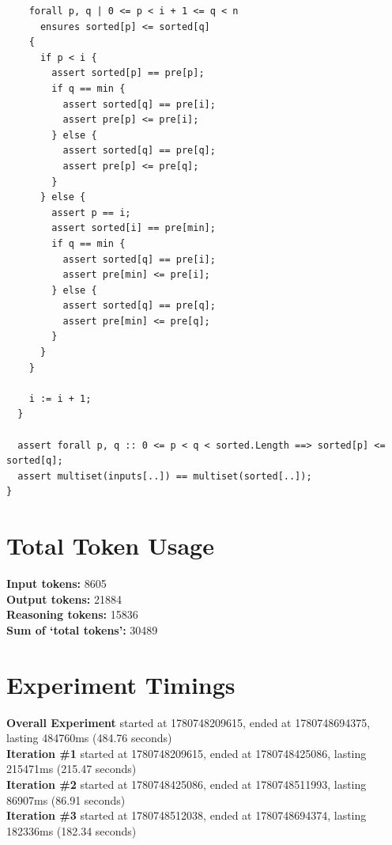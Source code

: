 \documentclass{article}
\begin{document}
\begin{lstlisting}
    forall p, q | 0 <= p < i + 1 <= q < n
      ensures sorted[p] <= sorted[q]
    {
      if p < i {
        assert sorted[p] == pre[p];
        if q == min {
          assert sorted[q] == pre[i];
          assert pre[p] <= pre[i];
        } else {
          assert sorted[q] == pre[q];
          assert pre[p] <= pre[q];
        }
      } else {
        assert p == i;
        assert sorted[i] == pre[min];
        if q == min {
          assert sorted[q] == pre[i];
          assert pre[min] <= pre[i];
        } else {
          assert sorted[q] == pre[q];
          assert pre[min] <= pre[q];
        }
      }
    }

    i := i + 1;
  }

  assert forall p, q :: 0 <= p < q < sorted.Length ==> sorted[p] <= sorted[q];
  assert multiset(inputs[..]) == multiset(sorted[..]);
}
\end{lstlisting}
\section*{Total Token Usage}
\textbf{Input tokens: }8605
\\\textbf{Output tokens: }21884
\\\textbf{Reasoning tokens: }15836
\\\textbf{Sum of `total tokens': }30489
\section*{Experiment Timings}
\textbf{Overall Experiment} started at 1780748209615, ended at 1780748694375, lasting 484760ms (484.76 seconds)
\\\textbf{Iteration \#1} started at 1780748209615, ended at 1780748425086, lasting 215471ms (215.47 seconds)
\\\textbf{Iteration \#2} started at 1780748425086, ended at 1780748511993, lasting 86907ms (86.91 seconds)
\\\textbf{Iteration \#3} started at 1780748512038, ended at 1780748694374, lasting 182336ms (182.34 seconds)
\end{document}
